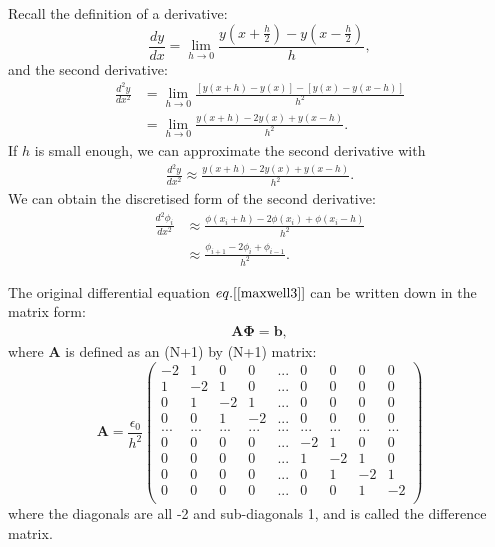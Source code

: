 \documentclass[paper=a4,fontsize=11pt]{scrartcl} %
\begin{document}
Recall the definition of a derivative:
\begin{equation}
\frac{dy}{dx} = \lim\limits_{h \to 0}\frac{y(x+\frac{h}{2})-y(x-\frac{h}{2})}{h},
\end{equation}
and the second derivative:
\begin{align}
    \frac{d^2y}{dx^2} &= \lim\limits_{h \to 0}\frac{[y(x+h) - y(x)] - [y(x)-y(x-h)]}{h^2} \\
    &=  \lim\limits_{h \to 0}\frac{y(x+h) - 2y(x) + y(x-h)}{h^2}.
\end{align}
If $h$ is small enough, we can approximate the second derivative with 
\begin{align}
    \frac{d^2y}{dx^2} \approx  \frac{y(x+h) - 2y(x) + y(x-h)}{h^2}.
\end{align}
We can obtain the discretised form of the second derivative:
\begin{align}\label{difference_matrix}
    \frac{d^2\phi_i}{dx^2} &\approx  \frac{\phi(x_i+h) - 2\phi(x_i) + \phi(x_i-h)}{h^2} \\
    &\approx \frac{\phi_{i+1} - 2\phi_i + \phi_{i-1}}{h^2}.
\end{align}

The original differential equation $eq.[\ref{maxwell3}]$ can be written down in the matrix form:
\begin{align}\label{matrix_equation}
    \mathbf{A}\mathbf{\Phi} = \mathbf{b},
\end{align}
where $\mathbf{A}$ is defined as an (N+1) by (N+1) matrix:
\begin{equation}
\mathbf{A}=\frac{\epsilon_0}{h^2}
    \begin{pmatrix}
    -2 & 1 & 0 & 0 & ... & 0 & 0 & 0 & 0 \\
    1 & -2 & 1 & 0 & ... & 0 & 0 & 0 & 0 \\
    0 & 1 & -2 & 1 & ... & 0 & 0 & 0 & 0 \\
    0 & 0 & 1 & -2 &  ... & 0 & 0 & 0 & 0\\
    ... & ... & ... & ... & ... & ... & ... & ... & ...\\
    0 & 0 & 0 & 0 &  ... & -2 & 1 & 0 & 0\\
    0 & 0 & 0 & 0 &  ... & 1 & -2 & 1 & 0\\
    0 & 0 & 0 & 0 &  ... & 0 & 1 & -2 & 1\\
    0 & 0 & 0 & 0 &  ... & 0 & 0 & 1 & -2\\
    \end{pmatrix}
\end{equation}
where the diagonals are all -2 and sub-diagonals 1, and is called the difference matrix.
\end{document}
